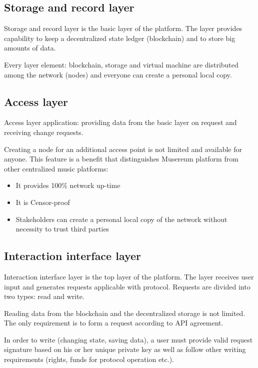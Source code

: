 \documentclass[12pt]{report}
\begin{document}
\subsection{Storage and record layer}
\label{tech-arch-underlayer}
Storage and record layer is the basic layer of the platform. The layer provides capability to keep a decentralized state ledger (blockchain) and to store big amounts of data.

Every layer element: blockchain, storage and virtual machine are distributed among the network (nodes) and everyone can create a personal local copy.
\subsection{Access layer}
\label{tech-arch-connect}
Access layer application: providing data from the basic layer on request and receiving change requests.

Creating a node for an additional access point is not limited and available for anyone. This feature is a benefit that distinguishes Musereum platform from other centralized music platforms:

\begin{itemize}
	\item It provides 100\% network up-time
	\item It is Censor-proof
	\item Stakeholders can create a personal local copy of the network without necessity to trust third parties
\end{itemize}
\pagebreak
\subsection{Interaction interface layer}
\label{tech-arch-interfaces}
Interaction interface layer is the top layer of the platform. The layer receives user input and generates requests applicable with protocol. Requests are divided into two types: read and write.

Reading data from the blockchain and the decentralized storage is not limited. The only requirement is to form a request according to API agreement.

In order to write (changing state, saving data), a user must provide valid request signature based on his or her unique private key as well as follow other writing requirements (rights, funds for protocol operation etc.).
\end{document}
